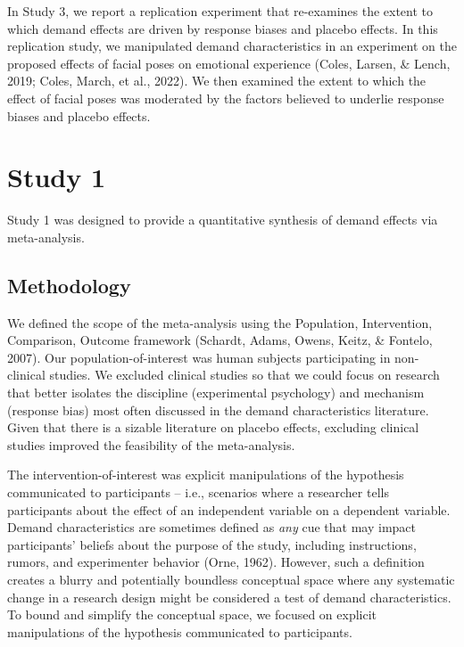 \documentclass[
  man,floatsintext]{apa6}
\begin{document}
In Study 3, we report a replication experiment that re-examines the extent to which demand effects are driven by response biases and placebo effects. In this replication study, we manipulated demand characteristics in an experiment on the proposed effects of facial poses on emotional experience (Coles, Larsen, \& Lench, 2019; Coles, March, et al., 2022). We then examined the extent to which the effect of facial poses was moderated by the factors believed to underlie response biases and placebo effects.

\hypertarget{study-1}{%
\section{Study 1}\label{study-1}}

Study 1 was designed to provide a quantitative synthesis of demand effects via meta-analysis.

\hypertarget{methodology}{%
\subsection{Methodology}\label{methodology}}

We defined the scope of the meta-analysis using the Population, Intervention, Comparison, Outcome framework (Schardt, Adams, Owens, Keitz, \& Fontelo, 2007). Our population-of-interest was human subjects participating in non-clinical studies. We excluded clinical studies so that we could focus on research that better isolates the discipline (experimental psychology) and mechanism (response bias) most often discussed in the demand characteristics literature. Given that there is a sizable literature on placebo effects, excluding clinical studies improved the feasibility of the meta-analysis.

The intervention-of-interest was explicit manipulations of the hypothesis communicated to participants -- i.e., scenarios where a researcher tells participants about the effect of an independent variable on a dependent variable. Demand characteristics are sometimes defined as \emph{any} cue that may impact participants' beliefs about the purpose of the study, including instructions, rumors, and experimenter behavior (Orne, 1962). However, such a definition creates a blurry and potentially boundless conceptual space where any systematic change in a research design might be considered a test of demand characteristics. To bound and simplify the conceptual space, we focused on explicit manipulations of the hypothesis communicated to participants.
\end{document}
